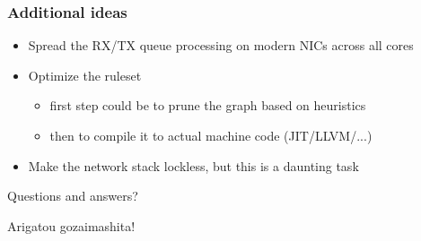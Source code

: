 \documentclass[magyar]{beamer}
\begin{document}
\begin{frame}
\frametitle{Additional ideas}
\begin{itemize}
	\item Spread the RX/TX queue processing on modern NICs across all cores
\pause
	\item Optimize the ruleset
	\begin{itemize}
		\item first step could be to prune the graph based on heuristics
		\item then to compile it to actual machine code (JIT/LLVM/...)
	\end{itemize}
\pause
	\item Make the network stack lockless, but this is a daunting task
\end{itemize}
\end{frame}

\begin{frame}
\begin{center}
Questions and answers?
\end{center}
\end{frame}

\begin{frame}
\begin{center}
Arigatou gozaimashita!
\end{center}
\end{frame}
\end{document}
